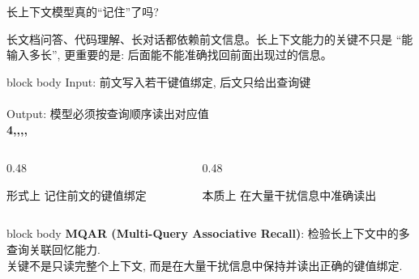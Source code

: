 \begin{frame}{长上下文模型真的“记住”了吗?}
  \centering
  \begin{minipage}{0.92\textwidth}
  \small
  长文档问答、代码理解、长对话都依赖前文信息。长上下文能力的关键不只是
  \textcolor{scured}{“能输入多长”}, 更重要的是: 后面能不能准确找回前面出现过的信息。

  \vskip0.32cm
  \begin{beamercolorbox}[sep=7pt,rounded=true,shadow=true,wd=\linewidth]{block body}
    \centering
    {\footnotesize\color{gray}Input: 前文写入若干键值绑定, 后文只给出查询键}\\[3pt]
    {}\\[5pt]
    {\footnotesize\color{gray}Output: 模型必须按查询顺序读出对应值}\\[3pt]
    {\Large\bfseries\color{scured}4,,,,}
  \end{beamercolorbox}

  \vskip0.30cm
  \begin{columns}[T,onlytextwidth]
    \begin{column}{0.48\linewidth}
      \begin{block}{形式上}
        \centering
        \vspace{0.12cm}
        记住前文的键值绑定
        \vspace{0.12cm}
      \end{block}
    \end{column}
    \begin{column}{0.48\linewidth}
      \begin{block}{本质上}
        \centering
        \vspace{0.12cm}
        在大量干扰信息中准确读出
        \vspace{0.12cm}
      \end{block}
    \end{column}
  \end{columns}

  \vskip0.12cm
  \begin{beamercolorbox}[sep=3pt,rounded=true,wd=\linewidth]{block body}
    \centering\small
    \textcolor{scured}{\bfseries MQAR (Multi-Query Associative Recall)}: 检验长上下文中的多查询关联回忆能力.\\[2pt]
    关键不是只读完整个上下文, 而是在大量干扰信息中保持并读出正确的键值绑定.
  \end{beamercolorbox}
  \end{minipage}
\end{frame}


